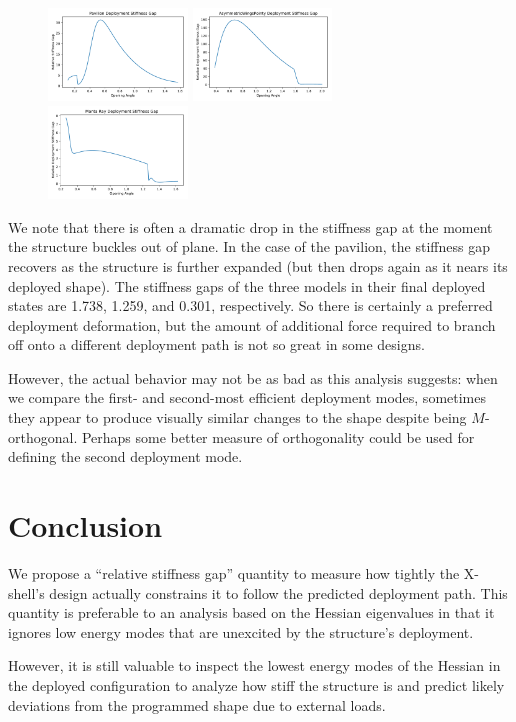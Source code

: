 \documentclass[10pt]{article}
\begin{document}
\begin{figure}[H]
    \includegraphics[width=0.33\textwidth]{plots/stiffness_gap_pavilion.pdf}
    \includegraphics[width=0.33\textwidth]{plots/stiffness_gap_asymmetric_wings_pointy.pdf}
    \includegraphics[width=0.33\textwidth]{plots/stiffness_gap_manta_ray.pdf}
\end{figure}

We note that there is often a dramatic drop in the stiffness gap at the moment
the structure buckles out of plane. In the case of the pavilion, the stiffness gap recovers
as the structure is further expanded (but then drops again as it nears its deployed shape).
The stiffness gaps of the three models in their final deployed states are
1.738, 1.259, and 0.301, respectively. So there is certainly a preferred deployment deformation, but
the amount of additional force required to branch off onto a different deployment path is not so
great in some designs.

However, the actual behavior may not be as bad as this analysis suggests: when we compare
the first- and second-most efficient deployment modes, sometimes they appear to produce visually
similar changes to the shape despite being $M$-orthogonal. Perhaps some better
measure of orthogonality could be used for defining the second deployment mode.

\section{Conclusion}
We propose a ``relative stiffness gap'' quantity to measure how tightly the
X-shell's design actually constrains it to follow the predicted deployment
path. This quantity is preferable to an analysis based on the Hessian
eigenvalues in that it ignores low energy modes that are unexcited by the
structure's deployment.

However, it is still valuable to inspect the lowest energy modes of the Hessian in
the deployed configuration to analyze how stiff the structure is and predict
likely deviations from the programmed shape due to external loads.
\end{document}
